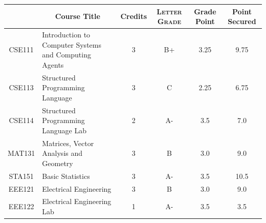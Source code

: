 \documentclass[11pt]{article}
\newcommand*{\numtwo}[1]{\pgfmathprintnumber[
                    fixed, precision=2, fixed zerofill=true]{#1}}
\begin{document}
                \begin{center}
                    \renewcommand{\arraystretch}{1.08}
                    
                \begin{tabular}{|c|l|c|>{\scshape}c|c|c|}
                \hline  \rule[-1ex]{0pt}{3.5ex} {\centering{\bf Course Code}} &  \multicolumn{1}{c|}{\textbf{Course Title}}  & {\bf Credits} & {\bf Letter Grade} & {\bf Grade Point} & {\bf Point Secured}  \\ 
                \hline   CSE111 &  Introduction to Computer Systems and Computing Agents		 & 3 & B+ & 3.25 & 9.75 \\ %
                \hline   CSE113 &  Structured Programming Language		 & 3 & C & 2.25 & 6.75 \\ %
                \hline   CSE114 &  Structured Programming Language Lab		 & 2 & A- & 3.5 & 7.0 \\ %
                \hline   MAT131 &  Matrices, Vector Analysis and Geometry		 & 3 & B & 3.0 & 9.0 \\ %
                \hline   STA151 &  Basic Statistics		 & 3 & A- & 3.5 & 10.5 \\ %
                \hline   EEE121 &  Electrical Engineering		 & 3 & B & 3.0 & 9.0 \\ %
                \hline   EEE122 &  Electrical Engineering Lab		 & 1 & A- & 3.5 & 3.5 \\ %

\hline                %
                \end{tabular}
                \end{center}
                \renewcommand{\arraystretch}{1.03}
\end{document}
